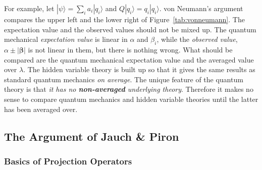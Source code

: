 \documentclass[12pt]{article}
\begin{document}
For example, let $|\psi\rangle=\sum_{i}a_i|q_i\rangle$ and $Q|q_i\rangle = q_i |q_i\rangle$.  von Neumann's argument compares the upper left and the lower right of Figure~\ref{tab:vonneumann}. The expectation value and the observed values should not be mixed up. The quantum mechanical {\it expectation value} is linear in $\alpha$ and $\beta_i$, while the {\it observed value}, $\alpha \pm |\bm{\beta}|$ is not linear in them, but there is nothing wrong. What should be compared are the quantum mechanical expectation value and the averaged value over $\lambda$. The hidden variable theory is built up so that it gives the same results as standard quantum mechanics \emph{on average}.  The unique feature of the quantum theory is that \emph{it has no \textbf{non-averaged} underlying theory}.  Therefore it makes no sense to compare quantum mechanics and hidden variable theories until the latter has been averaged over.


\subsection{The Argument of Jauch \& Piron}

\subsubsection{Basics of Projection Operators}
\end{document}
